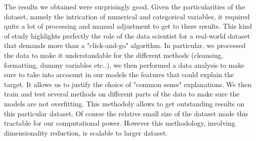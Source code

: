 \documentclass[11pt]{article}
\begin{document}
The results we obtained were surprisingly good. Given the particularities of the dataset, namely the intrication of numerical and categorical variables, it required quite a lot of processing and manual adjustment to get to these results. This kind of study highlights perfectly the role of the data scientist for a real-world dataset that demands more than a "click-and-go" algorithm. 
In particular, we processed the data to make it understandable for the different methods (cleansing, formatting, dummy variables etc..), we then performed a data analysis to make sure to take into accoount in our models the features that could explain the target. It allows us to justify the choice of "common sense" explanations. We then train and test several methods on different parts of the data to make sure the models are not overfitting. This methodoly allows to get outstanding results on this particular dataset. Of course the relative small size of the dataset made this tractable for our computational power. However this methodology, involving dimensionality reduction, is scalable to larger dataset.
\end{document}
